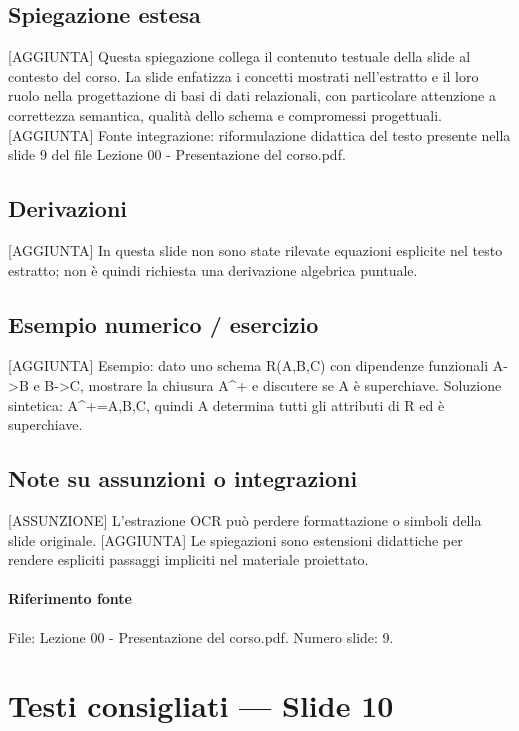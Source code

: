 \documentclass[11pt]{article}
\begin{document}
\subsection*{Spiegazione estesa}
[AGGIUNTA] Questa spiegazione collega il contenuto testuale della slide al contesto del corso. La slide enfatizza i concetti mostrati nell'estratto e il loro ruolo nella progettazione di basi di dati relazionali, con particolare attenzione a correttezza semantica, qualità dello schema e compromessi progettuali.
[AGGIUNTA] Fonte integrazione: riformulazione didattica del testo presente nella slide 9 del file Lezione 00 - Presentazione del corso.pdf.
\subsection*{Derivazioni}
[AGGIUNTA] In questa slide non sono state rilevate equazioni esplicite nel testo estratto; non è quindi richiesta una derivazione algebrica puntuale.
\subsection*{Esempio numerico / esercizio}
[AGGIUNTA] Esempio: dato uno schema R(A,B,C) con dipendenze funzionali A->B e B->C, mostrare la chiusura A^+ e discutere se A è superchiave. Soluzione sintetica: A^+={A,B,C}, quindi A determina tutti gli attributi di R ed è superchiave.
\subsection*{Note su assunzioni o integrazioni}
[ASSUNZIONE] L'estrazione OCR può perdere formattazione o simboli della slide originale.
[AGGIUNTA] Le spiegazioni sono estensioni didattiche per rendere espliciti passaggi impliciti nel materiale proiettato.
\paragraph{Riferimento fonte} File: Lezione 00 - Presentazione del corso.pdf. Numero slide: 9.
\section{Testi consigliati --- Slide 10}
\end{document}
